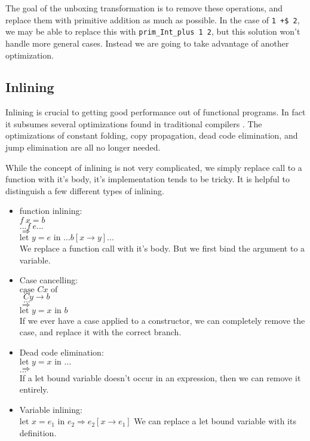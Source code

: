 \documentclass{article}
\begin{document}
The goal of the unboxing transformation is to remove these operations, 
and replace them with primitive addition as much as possible.
In the case of \texttt{1 +\$ 2}, we may be able to replace this with \texttt{prim\_Int\_plus 1 2},
but this solution won't handle more general cases.
Instead we are going to take advantage of another optimization.

\subsection{Inlining}

Inlining is crucial to getting good performance out of functional programs. \cite{inlining}
In fact it subsumes several optimizations found in traditional compilers \cite{inlining, appelComp, appelCont}.
The optimizations of constant folding, copy propagation, dead code elimination, and jump elimination are all
no longer needed.

While the concept of inlining is not very complicated, we simply replace call to a function with it's body,
it's implementation tends to be tricky. \cite{inlining}
It is helpful to distinguish a few different types of inlining.
\begin{itemize}
    \item function inlining:\\
        $f\ x = b$\\
        $... f\ e ...$\\
        $\Rightarrow$\\
        $\text{let } y = e \text{ in } ... b[x \to y] ...$\\
        We replace a function call with it's body.
        But we first bind the argument to a variable.
    \item Case cancelling:\\
        $\text{case } C x \text{ of }$\\
        $\ \ ...$\\
        $\ \ C y \rightarrow b$\\
        $\ \ ...$\\
        $\Rightarrow$\\
        $\text{let } y = x \text{ in } b$\\
        If we ever have a case applied to a constructor,
        we can completely remove the case, and replace it with the correct branch.
    \item Dead code elimination:\\
        $\text{let } y = x \text{ in } ...$\\
        $\Rightarrow$\\
        $...$\\
        If a let bound variable doesn't occur in an expression, then we can remove it entirely.
    \item Variable inlining:\\
        $\text{let } x = e_1 \text{ in } e_2 \Rightarrow e_2[x \to e_1]$
        We can replace a let bound variable with its definition.
\end{itemize}
\end{document}
